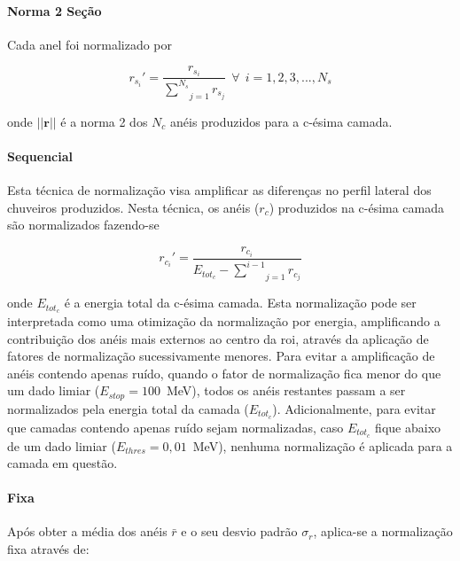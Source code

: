 \paragraph{Norma 2 Seção}
\label{par:norm_secao}

Cada anel foi normalizado por

\begin{equation}
r_{s_{i}}' = \frac{r_{s_{i}}}{\underset{j=1}{\overset{N_s}{ \sum}} r_{s_{j}}}~~\forall~~i=1,2,3,...,N_s
\end{equation}

\noindent onde $||\mathbf{r}||$ é a norma 2 dos $N_c$ anéis produzidos para a
c-ésima camada.

\paragraph{Sequencial}
\label{par:norm_seq}

Esta técnica de normalização visa amplificar as diferenças no perfil lateral dos chuveiros produzidos. 
Nesta técnica, os anéis ($r_c$) produzidos na c-ésima camada são normalizados fazendo-se

\begin{equation}
\label{eq:normalizacao_sequencial}
r_{c_{i}}' = \frac{r_{c_{i}}}{ E_{tot_{c}} - \underset{j=1}{\overset{i-1}{\sum}} r_{c_{j}} }
\end{equation}

\noindent onde $E_{tot_{c}}$ é a energia total da c-ésima camada. Esta normalização pode ser interpretada 
como uma otimização da normalização por energia, amplificando a contribuição dos anéis mais 
externos ao centro da \gls{roi}, através da aplicação de fatores de normalização sucessivamente menores. Para 
evitar a amplificação de anéis contendo apenas ruído, quando o fator de normalização fica menor do que 
um dado limiar  ($E_{stop} = 100$~MeV), todos os anéis restantes passam a ser normalizados pela energia 
total da camada ($E_{tot_{c}}$). Adicionalmente, para evitar que camadas contendo apenas ruído sejam 
normalizadas, caso $E_{tot_{c}}$ fique abaixo de um dado limiar ($E_{thres} = 0,01$~MeV), nenhuma 
normalização é aplicada para a camada em questão.

\paragraph{Fixa}

Após obter a média dos anéis $\bar{r}$ e o seu desvio padrão $\sigma_{r}$,
aplica-se a normalização fixa através de:

